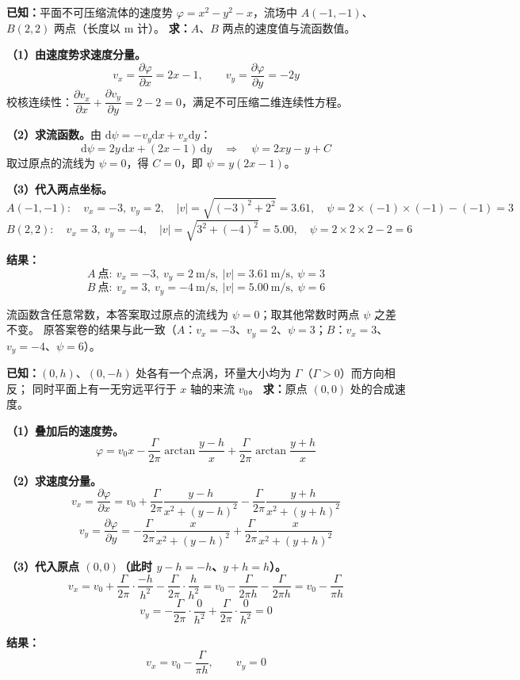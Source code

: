 \begin{jie}
\textbf{已知：}平面不可压缩流体的速度势 $\varphi=x^2-y^2-x$，流场中 $A(-1,-1)$、$B(2,2)$ 两点（长度以 m 计）。
\textbf{求：}$A$、$B$ 两点的速度值与流函数值。

\textbf{（1）由速度势求速度分量。}
\[
v_x=\frac{\partial\varphi}{\partial x}=2x-1,
\qquad
v_y=\frac{\partial\varphi}{\partial y}=-2y
\]
校核连续性：$\dfrac{\partial v_x}{\partial x}+\dfrac{\partial v_y}{\partial y}=2-2=0$，满足不可压缩二维连续性方程。

\textbf{（2）求流函数。}由 $\mathrm{d}\psi=-v_y\mathrm{d}x+v_x\mathrm{d}y$：
\[
\mathrm{d}\psi=2y\,\mathrm{d}x+(2x-1)\,\mathrm{d}y
\quad\Longrightarrow\quad
\psi=2xy-y+C
\]
取过原点的流线为 $\psi=0$，得 $C=0$，即 $\psi=y\left(2x-1\right)$。

\textbf{（3）代入两点坐标。}
\[
A(-1,-1):\quad v_x=-3,\ v_y=2,\quad |v|=\sqrt{(-3)^2+2^2}=3.61,
\quad \psi=2\times(-1)\times(-1)-(-1)=3
\]
\[
B(2,2):\quad v_x=3,\ v_y=-4,\quad |v|=\sqrt{3^2+(-4)^2}=5.00,
\quad \psi=2\times2\times2-2=6
\]

\textbf{结果：}
\[
\boxed{A\ \text{点}:\ v_x=-3,\ v_y=2\ \mathrm{m/s},\ |v|=3.61\ \mathrm{m/s},\ \psi=3}
\]
\[
\boxed{B\ \text{点}:\ v_x=3,\ v_y=-4\ \mathrm{m/s},\ |v|=5.00\ \mathrm{m/s},\ \psi=6}
\]
\end{jie}

\begin{tishi}
流函数含任意常数，本答案取过原点的流线为 $\psi=0$；取其他常数时两点 $\psi$ 之差不变。
原答案卷的结果与此一致（$A$：$v_x=-3$、$v_y=2$、$\psi=3$；$B$：$v_x=3$、$v_y=-4$、$\psi=6$）。
\end{tishi}


\begin{jie}
\textbf{已知：}$(0,h)$、$(0,-h)$ 处各有一个点涡，环量大小均为 $\Gamma$（$\Gamma>0$）而方向相反；
同时平面上有一无穷远平行于 $x$ 轴的来流 $v_0$。
\textbf{求：}原点 $(0,0)$ 处的合成速度。

\textbf{（1）叠加后的速度势。}
\[
\varphi=v_0x-\frac{\Gamma}{2\pi}\arctan\frac{y-h}{x}+\frac{\Gamma}{2\pi}\arctan\frac{y+h}{x}
\]

\textbf{（2）求速度分量。}
\[
v_x=\frac{\partial\varphi}{\partial x}
=v_0+\frac{\Gamma}{2\pi}\frac{y-h}{x^2+(y-h)^2}-\frac{\Gamma}{2\pi}\frac{y+h}{x^2+(y+h)^2}
\]
\[
v_y=\frac{\partial\varphi}{\partial y}
=-\frac{\Gamma}{2\pi}\frac{x}{x^2+(y-h)^2}+\frac{\Gamma}{2\pi}\frac{x}{x^2+(y+h)^2}
\]

\textbf{（3）代入原点 $(0,0)$（此时 $y-h=-h$、$y+h=h$）。}
\[
v_x=v_0+\frac{\Gamma}{2\pi}\cdot\frac{-h}{h^2}-\frac{\Gamma}{2\pi}\cdot\frac{h}{h^2}
=v_0-\frac{\Gamma}{2\pi h}-\frac{\Gamma}{2\pi h}
=v_0-\frac{\Gamma}{\pi h}
\]
\[
v_y=-\frac{\Gamma}{2\pi}\cdot\frac{0}{h^2}+\frac{\Gamma}{2\pi}\cdot\frac{0}{h^2}=0
\]

\textbf{结果：}
\[
\boxed{v_x=v_0-\frac{\Gamma}{\pi h},\qquad v_y=0}
\]
\end{jie}

